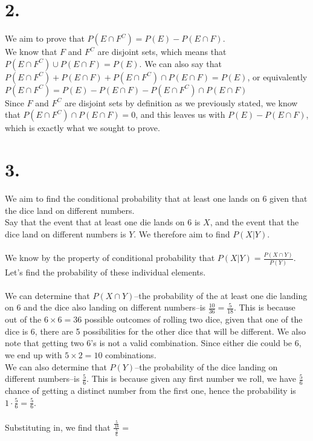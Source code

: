 \documentclass{article}
\begin{document}
\section*{2.}
{\Large

We aim to prove that $P(E \cap F^C) = P(E) - P(E \cap F)$. \\
We know that $F$ and $F^C$ are disjoint sets, which means that $P(E \cap F^C) \cup P(E \cap F) = P(E)$. We can also say that \\ $P(E \cap F^C) + P(E \cap F) + P(E \cap F^C) \cap P(E \cap F) = P(E)$, or equivalently \\
$P(E \cap F^C) = P(E) - P(E \cap F) - P(E \cap F^C) \cap P(E \cap F)$
\\ Since $F$ and $F^C$ are disjoint sets by definition as we previously stated, we know that $ P(E \cap F^C) \cap P(E \cap F) = 0$, and this leaves us with $P(E) - P(E \cap F)$, which is exactly what we sought to prove.

}

\section*{3.}
{\Large 

We aim to find the conditional probability that at least one lands on 6 given that the dice land on different numbers. \\
Say that the event that at least one die lands on 6 is $X$, and the event that the dice land on different numbers is $Y$. We therefore aim to find $P(X|Y)$. \\ \\
We know by the property of conditional probability that $P(X|Y) = \frac{P(X \cap Y)}{P(Y)}$. Let's find the probability of these individual elements. \\ \\ 
We can determine that $P(X \cap Y)$--the probability of the at least one die landing on 6 and the dice also landing on different numbers--is $\frac{10}{36} = \frac{5}{18}$. This is because out of the $6 \times 6 = 36$ possible outcomes of rolling two dice, given that one of the dice is 6, there are 5 possibilities for the other dice that will be different. We also note that getting two 6's is not a valid combination. Since either die could be 6, we end up with $5 \times 2 = 10$ combinations. \\ 
We can also determine that $P(Y)$--the probability of the dice landing on different numbers--is $\frac{5}{6}$. This is because given any first number we roll, we have $\frac{5}{6}$ chance of getting a distinct number from the first one, hence the probability is $1 \cdot \frac{5}{6} = \frac{5}{6}$. \\ \\ 
Substituting in, we find that $\frac{\frac{5}{18}}{\frac{5}{6}} = $ 

}
\end{document}

